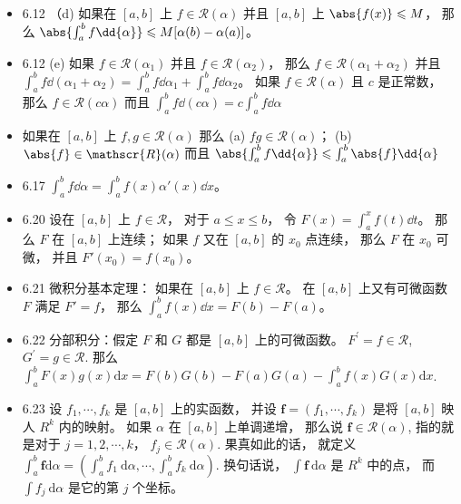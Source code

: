 \begin{itemize}
\item 6.12 （d) 如果在 $[a,b]$ 上 $f\in \mathscr{R}(\alpha)$ 并且 $[a,b]$ 上 $\abs{f(x)}\leqslant M$， 那么 $\abs{\int_a^bf\dd{\alpha}} \leqslant M[\alpha(b)-\alpha(a)]$。

\item 6.12 (e) 如果 $f\in \mathscr{R}(\alpha_1)$ 并且 $f\in \mathscr{R}(\alpha_2)$， 那么 $f\in \mathscr{R}(\alpha_1+\alpha_2)$ 并且 $\int_a^bf\dd{(\alpha_1+\alpha_2)} = \int_a^bf\dd{\alpha_1}+ \int_a^bf\dd{\alpha_2}$。 如果 $f\in \mathscr{R}(\alpha)$ 且 $c$ 是正常数， 那么 $f\in \mathscr{R}(c\alpha)$ 而且 $\int_a^bf\dd{(c\alpha)} = c\int_a^bf\dd{\alpha}$

\item 如果在 $[a,b]$ 上 $f,g\in \mathscr{R}(\alpha)$ 那么 (a) $fg\in \mathscr{R}(\alpha)$； (b) $\abs{f}\in \mathscr{R}(\alpha)$ 而且 $\abs{\int_a^bf\dd{\alpha}} \leqslant \int_a^b\abs{f}\dd{\alpha}$

\item 6.17 $\int_a^b f\dd{\alpha} = \int_a^b f(x)\alpha'(x)\dd{x}$。

\item 6.20 设在 $[a,b]$ 上 $f\in \mathscr{R}$， 对于 $a\leqslant x\leqslant b$， 令 $F(x) = \int_a^x f(t)\dd{t}$。 那么 $F$ 在 $[a,b]$ 上连续； 如果 $f$ 又在 $[a,b]$ 的 $x_0$ 点连续， 那么 $F$ 在 $x_0$ 可微， 并且 $F'(x_0) = f(x_0)$。

\item 6.21 微积分基本定理： 如果在 $[a,b]$ 上 $f\in \mathscr{R}$。 在 $[a,b]$ 上又有可微函数 $F$ 满足 $F' = f$， 那么 $\int_a^b f(x)\dd{x} = F(b)-F(a)$。

\item 6.22 分部积分：假定 $F$ 和 $G$ 都是 $[a, b]$ 上的可微函数。 $F^{\prime}=f \in \mathscr{R}$, $G^{\prime}=g \in \mathscr{R}$. 那么 $\int_{a}^{b} F(x) g(x) \mathrm{d} x=F(b) G(b)-F(a) G(a)-\int_{a}^{b} f(x) G(x) \mathrm{d} x$.

\item 6.23 设 $f_{1}, \cdots, f_{k}$ 是 $[a, b]$ 上的实函数， 并设 $\boldsymbol{f}=\left(f_{1}, \cdots, f_{k}\right)$ 是将 $[a, b]$ 映人 $R^{k}$ 内的映射。 如果 $\alpha$ 在 $[a, b]$ 上单调递增， 那么说 $\boldsymbol f \in \mathscr{R}(\alpha)$, 指的就是对于 $j=1,2, \cdots, k$， $f_{j} \in \mathscr{R}(\alpha)$. 果真如此的话， 就定义 $\int_{a}^{b} \boldsymbol{f} \mathrm{d} \alpha=\left(\int_{a}^{b} f_{1} \mathrm{~d} \alpha, \cdots, \int_{a}^{b} f_{k} \mathrm{~d} \alpha\right)$. 换句话说， $\int \boldsymbol{f} \mathrm{~d} \alpha$ 是 $R^{k}$ 中的点， 而 $\int f_{j} \mathrm{~d} \alpha$ 是它的第 $j$ 个坐标。


\end{itemize}
